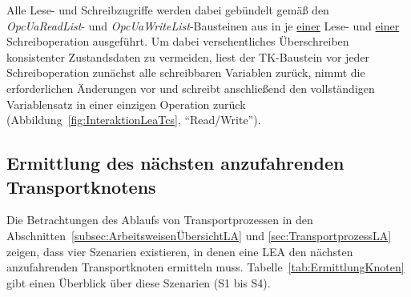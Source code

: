 Alle Lese- und Schreibzugriffe werden dabei gebündelt gemäß den \emph{OpcUaReadList}- und \emph{OpcUaWriteList}-Bausteinen aus \cite{OPCFoundation.30001} in je \underline{einer} Lese- und \underline{einer} Schreiboperation ausgeführt. Um dabei versehentliches Überschreiben konsistenter Zustandsdaten zu vermeiden, liest der TK-Baustein vor jeder Schreiboperation zunächst alle schreibbaren Variablen zurück, nimmt die erforderlichen Änderungen vor und schreibt anschließend den vollständigen Variablensatz in einer einzigen Operation zurück (Abbildung~\ref{fig:InteraktionLeaTcs}, \enquote{Read/Write}). 

\subsection{Ermittlung des nächsten anzufahrenden Transportknotens}
\label{subsec:ErmittlungNextNode}

Die Betrachtungen des Ablaufs von Transportprozessen in den Abschnitten~\ref{subsec:ArbeitsweisenÜbersichtLA} und \ref{sec:TransportprozessLA} zeigen, dass vier Szenarien existieren, in denen eine LEA den nächsten anzufahrenden Transportknoten ermitteln muss. Tabelle~\ref{tab:ErmittlungKnoten} gibt einen Überblick über diese Szenarien (S1 bis S4).

